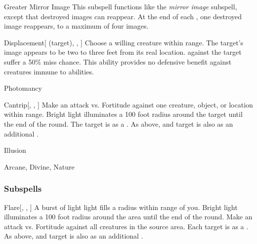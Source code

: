 \begin{ability}[\nth{4}]{Greater Mirror Image}
This subspell functions like the \textit{mirror image} subspell, except that destroyed images can reappear.
At the end of each , one destroyed image reappears, to a maximum of four images.
\end{ability}
\vspace{0.25em}


\begin{ability}[\nth{6}]{Displacement}[ (target), , ]
Choose a willing creature within \rngmed range.
The target's image appears to be two to three feet from its real location.
  against the target suffer a 50\% miss chance.
This ability provides no defensive benefit against creatures immune to  abilities.
\end{ability}
\vspace{0.25em}

\newpage
\begin{spellsection}{Photomancy}


\begin{ability}{Cantrip}[, , ]
Make an attack vs. Fortitude against one creature, object, or location within \rngmed range.
Bright light illuminates a 100 foot radius around the target until the end of the round.
\hit The target is \dazzled as a .
\crit As above, and target is also \dazed as an additional .
\end{ability}




 Illusion

 Arcane, Divine, Nature
\end{spellsection}


\subsubsection{Subspells}


\begin{ability}[\nth{1}]{Flare}[, , ]
A burst of light light fills a \areasmall radius within \rngmed range of you.
Bright light illuminates a 100 foot radius around the area until the end of the round.
Make an attack vs. Fortitude against all creatures in the source area.
\hit Each target is \dazzled as a .
\crit As above, and target is also \dazed as an additional .
\end{ability}
\vspace{0.25em}


